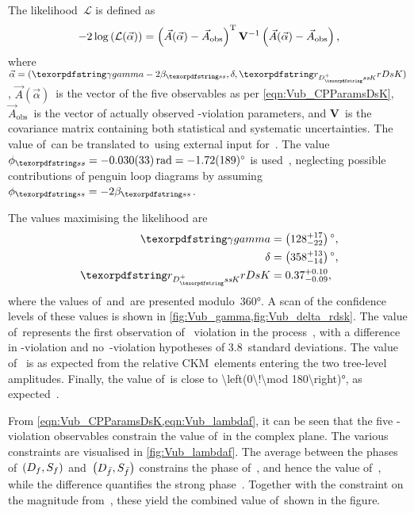 The likelihood~\(\mathcal{L}\) is defined as
%
\begin{equation}
    -2\log\left(\mathcal{L}(\vec{\alpha})\right) = \left(\vec{A}(\vec{\alpha}) - \vec{A}_{\text{obs}}\right)^{\text{T}} \mathbf{V}^{-1} \left(\vec{A}(\vec{\alpha}) - \vec{A}_{\text{obs}}\right) \rlap{,}
\end{equation}
%
where \({\vec{\alpha} = (\weak, \strongangle, \rdsk)}\), \({\vec{A}(\vec{\alpha})}\)~is the vector of the five observables as per \cref{eqn:Vub_CPParamsDsK}, \(\vec{A}_{\text{obs}}\)~is the vector of actually observed \CP-violation parameters, and \(\mathbf{V}\)~is the covariance matrix containing both statistical and systematic uncertainties.
The value of~\weak can be translated to~\CPgamma using external input for~\betas.
The value~\({\phis = \SI{-0.03 +- 0.033}{\radian} = \ang{-1.72 +- 1.89}}\) is used~\cite{HFLAV2016}, neglecting possible contributions of penguin loop diagrams by assuming~\({\phis = -2\betas}\).

The values maximising the likelihood are
%
\begin{subequations}
    \begin{align}
        \CPgamma     &= \ang[parse-numbers=false]{\left(128_{-22}^{+17}\right)} \rlap{,} \\
        \strongangle &= \ang[parse-numbers=false]{\left(358_{-14}^{+13}\right)} \rlap{,} \\
        \rdsk        &= 0.37_{-0.09}^{+0.10} \rlap{,}
    \end{align}
\end{subequations}
%
where the values of~\CPgamma and~\strongangle are presented modulo~\ang{360}.
A scan of the confidence levels of these values is shown in \cref{fig:Vub_gamma,fig:Vub_delta_rdsk}.
The value of~\CPgamma represents the first observation of \CP~violation in the process~\BsDsK, with a difference in \CP-violation and no~\CP-violation hypotheses of \num{3.8}~standard deviations.
The value of \rdsk~is as expected from the relative CKM~elements entering the two tree-level amplitudes.
Finally, the value of~\strongangle is close to \ang[parse-numbers=false]{\left(0\!\mod 180\right)}, as expected~\cite{Fleischer:2003yb}.

From \cref{eqn:Vub_CPParamsDsK,eqn:Vub_lambdaf}, it can be seen that the five \CP-violation observables constrain the value of~\lf in the complex plane.
The various constraints are visualised in \cref{fig:Vub_lambdaf}.
The average between the phases of~\({\left(D_{f}, S_{f}\right)}\) and~\({\left(D_{\bar{f}}, S_{\bar{f}}\right)}\) constrains the phase of~\lf, and hence the value of~\weak, while the difference quantifies the strong phase~\strongangle.
Together with the constraint on the magnitude from~\Cpar, these yield the combined value of~\CPgamma shown in the figure.

